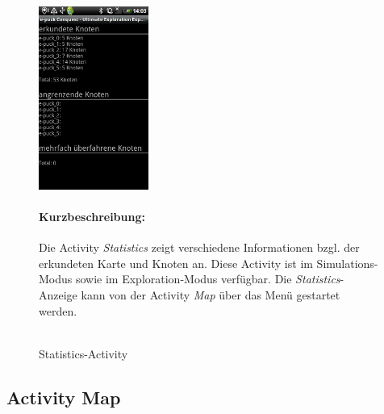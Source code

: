 \documentclass[10pt,a4paper]{article}
\begin{document}
\begin{figure}[htbp]

				\begin{minipage}[t]{6cm}
					\vspace{5pt}					
			 		\includegraphics[height=6cm]{images/statistic.png}
 					\caption{Statistics-Activity}
				\end{minipage}
				\hfill
				\begin{minipage}[t]{6cm}
					\vspace{10pt}
					\paragraph*{Kurzbeschreibung:}
 		Die Activity \textit{Statistics} zeigt verschiedene Informationen bzgl. der erkundeten Karte und Knoten an. Diese Activity ist im Simulations-Modus sowie im
 		Exploration-Modus verf\"ugbar. Die \textit{Statistics}-Anzeige kann von der Activity \textit{Map} \"uber das Men\"u gestartet werden. \\ \\
				\end{minipage}



\end{figure} 		
 	\subsection{Activity Map}
\end{document}
